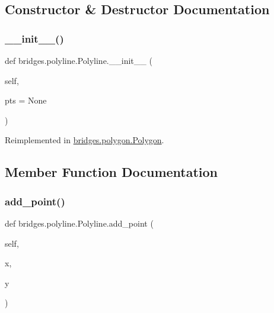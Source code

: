 \subsection{Constructor \& Destructor Documentation}
\mbox{\label{classbridges_1_1polyline_1_1_polyline_a536cf599bc221283c8e8d6df2324f23e}} 
\subsubsection{\texorpdfstring{\_\_init\_\_()}{\_\_init\_\_()}}
{\footnotesize\ttfamily def bridges.\+polyline.\+Polyline.\+\_\+\+\_\+init\+\_\+\+\_\+ (\begin{DoxyParamCaption}\item[{}]{self,  }\item[{}]{pts = {\ttfamily None} }\end{DoxyParamCaption})}



Reimplemented in \mbox{\hyperlink{classbridges_1_1polygon_1_1_polygon_a6e2515889df5d8626a32de2d4b36abc1}{bridges.\+polygon.\+Polygon}}.



\subsection{Member Function Documentation}
\mbox{\label{classbridges_1_1polyline_1_1_polyline_a0afbd2327d8dcba63809a6be07704753}} 
\subsubsection{\texorpdfstring{add\_point()}{add\_point()}}
{\footnotesize\ttfamily def bridges.\+polyline.\+Polyline.\+add\+\_\+point (\begin{DoxyParamCaption}\item[{}]{self,  }\item[{}]{x,  }\item[{}]{y }\end{DoxyParamCaption})}

